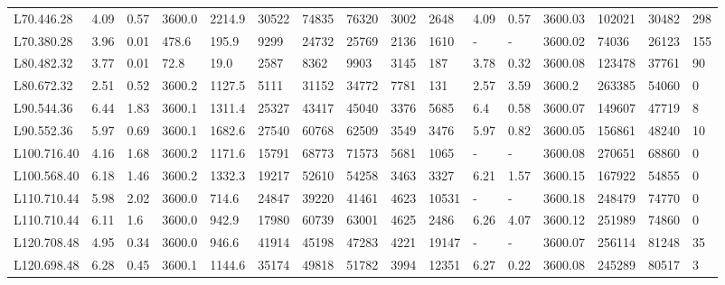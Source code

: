 \begin{table}[htbp]
{\begin{tabular}{*{1}{l}|*{9}{l}|*{6}{l}}
      \midrule
          L70.446.28 &4.09&0.57&3600.0&2214.9&30522&74835&76320&3002&2648&4.09&0.57&3600.03&102021&30482&298 \\
        L70.380.28  &3.96&0.01&478.6&195.9&9299&24732&25769&2136&1610&-&-&3600.02&74036&26123&155 \\
      \midrule
        L80.482.32 &3.77&0.01&72.8&19.0&2587&8362&9903&3145&187&3.78&0.32&3600.08&123478&37761&90  \\
        L80.672.32 &2.51&0.52&3600.2&1127.5&5111&31152&34772&7781&131&2.57&3.59&3600.2&263385&54060&0 \\
      \midrule
        L90.544.36 &6.44&1.83&3600.1&1311.4&25327&43417&45040&3376&5685&6.4&0.58&3600.07&149607&47719&8 \\
        L90.552.36 &5.97&0.69&3600.1&1682.6&27540&60768&62509&3549&3476&5.97&0.82&3600.05&156861&48240&10  \\
      \midrule
          L100.716.40  &4.16&1.68&3600.2&1171.6&15791&68773&71573&5681&1065&-&-&3600.08&270651&68860&0 \\
        L100.568.40 &6.18&1.46&3600.2&1332.3&19217&52610&54258&3463&3327&6.21&1.57&3600.15&167922&54855&0 \\
      \midrule
        L110.710.44 &5.98&2.02&3600.0&714.6&24847&39220&41461&4623&10531&-&-&3600.18&248479&74770&0 \\
        L110.710.44  &6.11&1.6&3600.0&942.9&17980&60739&63001&4625&2486&6.26&4.07&3600.12&251989&74860&0  \\
      \midrule
        L120.708.48 &4.95&0.34&3600.0&946.6&41914&45198&47283&4221&19147&-&-&3600.07&256114&81248&35 \\
        L120.698.48  &6.28&0.45&3600.1&1144.6&35174&49818&51782&3994&12351&6.27&0.22&3600.08&245289&80517&3 \\
      \bottomrule
    \end{tabular}}%
    \label{expl}%
\end{table}%

